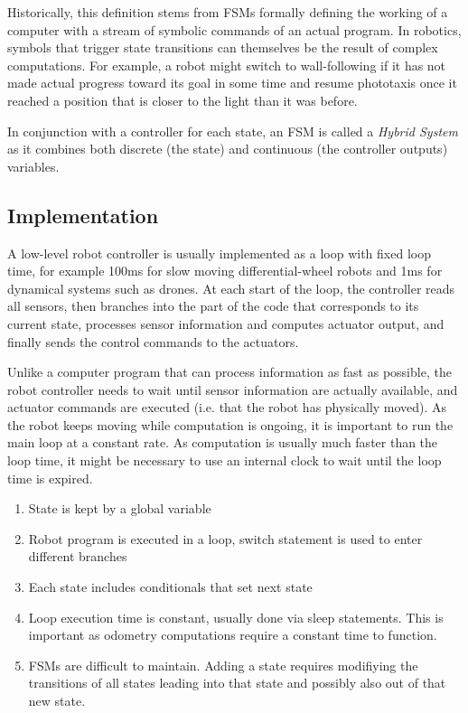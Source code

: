 Historically, this definition stems from FSMs formally defining the working of a computer with a stream of symbolic commands of an actual program. In robotics, symbols that trigger state transitions can themselves be the result of complex computations. For example, a robot might switch to wall-following if it has not made actual progress toward its goal in some time and resume phototaxis once it reached a position that is closer to the light than it was before.

In conjunction with a controller for each state, an FSM is called a \emph{Hybrid System}\cite{van2000introduction} as it combines both discrete (the state) and continuous (the controller outputs) variables.

\subsection{Implementation}
A low-level robot controller is usually implemented as a loop with fixed loop time, for example 100ms for slow moving differential-wheel robots and 1ms for dynamical systems such as drones. At each start of the loop, the controller reads all sensors, then branches into the part of the code that corresponds to its current state, processes sensor information and computes actuator output, and finally sends the control commands to the actuators.

Unlike a computer program that can process information as fast as possible, the robot controller needs to wait until sensor information are actually available, and actuator commands are executed (i.e. that the robot has physically moved). As the robot keeps moving while computation is ongoing, it is important to run the main loop at a constant rate. As computation is usually much faster than the loop time, it might be necessary to use an internal clock to wait until the loop time is expired.





\begin{enumerate}
\item State is kept by a global variable
\item Robot program is executed in a loop, switch statement is used to enter different branches
\item Each state includes conditionals that set next state
\item Loop execution time is constant, usually done via sleep statements. This is important as odometry computations require a constant time to function.
\item FSMs are difficult to maintain. Adding a state requires modifiying the transitions of all states leading into that state and possibly also out of that new state.
\end{enumerate}

